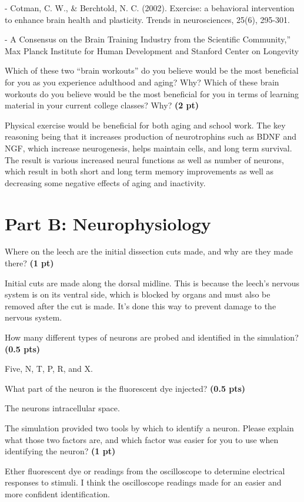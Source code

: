 \documentclass[12pt,a4paper]{article}
\begin{document}
\begin{enumerate}[font=\bfseries, wide]
    - Cotman, C. W., \& Berchtold, N. C. (2002). Exercise: a behavioral intervention to enhance brain health and plasticity. Trends in neurosciences, 25(6), 295-301.

    - A Consensus on the Brain Training Industry from the Scientific Community,”  Max Planck Institute for Human Development and Stanford Center on Longevity

    {\color{under}\item Which of these two “brain workouts” do you believe would be the most beneficial for you as you experience adulthood and aging? Why? Which of these brain workouts do you believe would be the most beneficial for you in terms of learning material in your current college classes? Why? \textbf{(2 pt)}}

    Physical exercise would be beneficial for both aging and school work. The key reasoning being that it increases production of neurotrophins such as BDNF and NGF, which increase neurogenesis, helps maintain cells, and long term survival. The result is various increased neural functions as well as number of neurons, which result in both short and long term memory improvements as well as decreasing some negative effects of aging and inactivity. 
\end{enumerate}
\newpage 

\section*{Part B: Neurophysiology}
\begin{enumerate}[font=\bfseries, wide, resume]
    {\color{under}\item Where on the leech are the initial dissection cuts made, and why are they made there? \textbf{(1 pt)}}

    Initial cuts are made along the dorsal midline. This is because the leech's nervous system is on its ventral side, which is blocked by organs and must also be removed after the cut is made. It's done this way to prevent damage to the nervous system.

    {\color{under}\item How many different types of neurons are probed and identified in the simulation?\textbf{(0.5 pts)}}

    Five, N, T, P, R, and X.

    {\color{under}\item What part of the neuron is the fluorescent dye injected? \textbf{(0.5 pts)}}

    The neurons intracellular space. 

    {\color{under}\item The simulation provided two tools by which to identify a neuron. Please explain what those two factors are, and which factor was easier for you to use when identifying the neuron? \textbf{(1 pt)}}

    Ether fluorescent dye or readings from the oscilloscope to determine electrical responses to stimuli. I think the oscilloscope readings made for an easier and more confident identification.
\end{enumerate}
\vspace{-12 pt}
\end{document}
